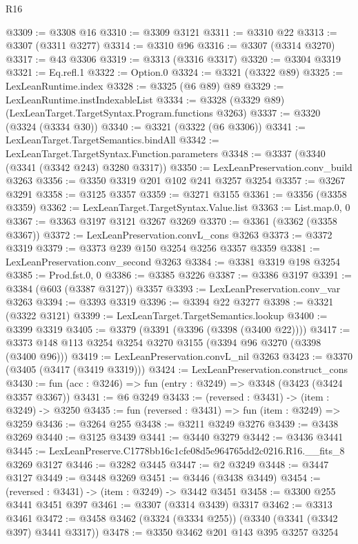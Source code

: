 \begin{lexlean}{R16}
\begin{coremodule}
@3309 := @3308 @16
@3310 := @3309 @3121
@3311 := @3310 @22
@3313 := @3307 (@3311 @3277)
@3314 := @3310 @96
@3316 := @3307 (@3314 @3270)
@3317 := @43 @3306
@3319 := @3313 (@3316 @3317)
@3320 := @3304 @3319
@3321 := Eq.refl.{1}
@3322 := Option.{0}
@3324 := @3321 (@3322 @89)
@3325 := LexLeanRuntime.index
@3328 := @3325 (@6 @89) @89
@3329 := LexLeanRuntime.instIndexableList
@3334 := @3328 (@3329 @89) (LexLeanTarget.TargetSyntax.Program.functions @3263)
@3337 := @3320 (@3324 (@3334 @30))
@3340 := @3321 (@3322 (@6 @3306))
@3341 := LexLeanTarget.TargetSemantics.bindAll
@3342 := LexLeanTarget.TargetSyntax.Function.parameters
@3348 := @3337 (@3340 (@3341 (@3342 @243) @3280 @3317))
@3350 := LexLeanPreservation.conv_build @3263
@3356 := @3350 @3319 @201 @102 @241 @3257 @3254
@3357 := @3267 @3291
@3358 := @3125 @3357
@3359 := @3271 @3155
@3361 := @3356 (@3358 @3359)
@3362 := LexLeanTarget.TargetSyntax.Value.list
@3363 := List.map.{0, 0}
@3367 := @3363 @3197 @3121 @3267 @3269
@3370 := @3361 (@3362 (@3358 @3367))
@3372 := LexLeanPreservation.convL_cons @3263
@3373 := @3372 @3319
@3379 := @3373 @239 @150 @3254 @3256 @3357 @3359
@3381 := LexLeanPreservation.conv_second @3263
@3384 := @3381 @3319 @198 @3254
@3385 := Prod.fst.{0, 0}
@3386 := @3385 @3226
@3387 := @3386 @3197
@3391 := @3384 (@603 (@3387 @3127)) @3357
@3393 := LexLeanPreservation.conv_var @3263
@3394 := @3393 @3319
@3396 := @3394 @22 @3277
@3398 := @3321 (@3322 @3121)
@3399 := LexLeanTarget.TargetSemantics.lookup
@3400 := @3399 @3319
@3405 := @3379 (@3391 (@3396 (@3398 (@3400 @22))))
@3417 := @3373 @148 @113 @3254 @3254 @3270 @3155 (@3394 @96 @3270 (@3398 (@3400 @96)))
@3419 := LexLeanPreservation.convL_nil @3263
@3423 := @3370 (@3405 (@3417 (@3419 @3319)))
@3424 := LexLeanPreservation.construct_cons
@3430 := fun (acc : @3246) => fun (entry : @3249) => @3348 (@3423 (@3424 @3357 @3367))
@3431 := @6 @3249
@3433 := (reversed : @3431) -> (item : @3249) -> @3250
@3435 := fun (reversed : @3431) => fun (item : @3249) => @3259
@3436 := @3264 @255
@3438 := @3211 @3249 @3276
@3439 := @3438 @3269
@3440 := @3125 @3439
@3441 := @3440 @3279
@3442 := @3436 @3441
@3445 := LexLeanPreserve.C1778bb16c1cfe08d5e964765dd2c0216.R16.__fits_8 @3269 @3127
@3446 := @3282 @3445
@3447 := @2 @3249
@3448 := @3447 @3127
@3449 := @3448 @3269
@3451 := @3446 (@3438 @3449)
@3454 := (reversed : @3431) -> (item : @3249) -> @3442 @3451
@3458 := @3300 @255 @3441 @3451 @397
@3461 := @3307 (@3314 @3439) @3317
@3462 := @3313 @3461
@3472 := @3458 @3462 (@3324 (@3334 @255)) (@3340 (@3341 (@3342 @397) @3441 @3317))
@3478 := @3350 @3462 @201 @143 @395 @3257 @3254

\end{coremodule}
\end{lexlean}
